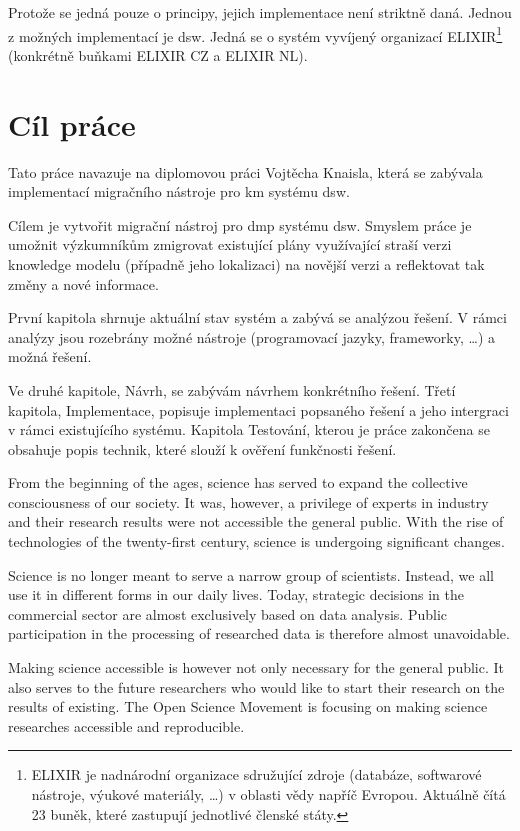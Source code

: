 Protože se jedná pouze o principy, jejich implementace není striktně daná.
Jednou z možných implementací je \gls{dsw}.
Jedná se o systém vyvíjený organizací ELIXIR\footnote{ELIXIR je nadnárodní organizace sdružující zdroje (databáze, softwarové nástroje, výukové materiály, \dots) v oblasti vědy napříč Evropou. Aktuálně čítá 23 buněk, které zastupují jednotlivé členské státy.} (konkrétně buňkami ELIXIR CZ a ELIXIR NL).

\section*{Cíl práce}

Tato práce navazuje na diplomovou práci Vojtěcha Knaisla, která se zabývala implementací migračního nástroje pro \gls{km} systému \gls{dsw}.

Cílem je vytvořit migrační nástroj pro \gls{dmp} systému \gls{dsw}.
Smyslem práce je umožnit výzkumníkům zmigrovat existující plány využívající straší verzi knowledge modelu (případně jeho lokalizaci) na novější verzi a reflektovat tak změny a nové informace.

\medskip

První kapitola shrnuje aktuální stav systém a zabývá se analýzou řešení.
V rámci analýzy jsou rozebrány možné nástroje (programovací jazyky, frameworky, \dots) a možná řešení.

Ve druhé kapitole, Návrh, se zabývám návrhem konkrétního řešení.
Třetí kapitola, Implementace, popisuje implementaci popsaného řešení a jeho intergraci v rámci existujícího systému.
Kapitola Testování, kterou je práce zakončena se obsahuje popis technik, které slouží k ověření funkčnosti řešení.

From the beginning of the ages, science has served to expand the collective consciousness of our society.
It was, however, a privilege of experts in industry and their research results were not accessible the general public.
With the rise of technologies of the twenty-first century, science is undergoing significant changes.

Science is no longer meant to serve a narrow group of scientists.
Instead, we all use it in different forms in our daily lives.
Today, strategic decisions in the commercial sector are almost exclusively based on data analysis.
Public participation in the processing of researched data is therefore almost unavoidable.

Making science accessible is however not only necessary for the general public.
It also serves to the future researchers who would like to start their research on the results of existing.
The Open Science Movement is focusing on making science researches accessible and reproducible.

